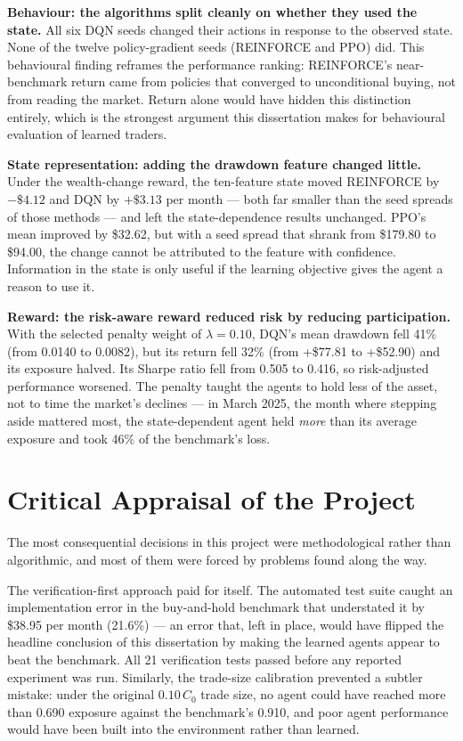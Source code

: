 \textbf{Behaviour: the algorithms split cleanly on whether they used the
state.} All six DQN seeds changed their actions in response to the observed
state. None of the twelve policy-gradient seeds (REINFORCE and PPO) did.
This behavioural finding reframes the performance ranking: REINFORCE's
near-benchmark return came from policies that converged to unconditional
buying, not from reading the market. Return alone would have hidden this
distinction entirely, which is the strongest argument this dissertation
makes for behavioural evaluation of learned traders.

\textbf{State representation: adding the drawdown feature changed little.}
Under the wealth-change reward, the ten-feature state moved REINFORCE by
$-\$4.12$ and DQN by $+\$3.13$ per month --- both far smaller than the seed
spreads of those methods --- and left the state-dependence results
unchanged. PPO's mean improved by \$32.62, but with a seed spread that
shrank from \$179.80 to \$94.00, the change cannot be attributed to the
feature with confidence. Information in the state is only useful if the
learning objective gives the agent a reason to use it.

\textbf{Reward: the risk-aware reward reduced risk by reducing
participation.} With the selected penalty weight of $\lambda = 0.10$, DQN's
mean drawdown fell 41\% (from 0.0140 to 0.0082), but its return fell 32\%
(from +\$77.81 to +\$52.90) and its exposure halved. Its Sharpe ratio fell
from 0.505 to 0.416, so risk-adjusted performance worsened. The penalty
taught the agents to hold less of the asset, not to time the market's
declines --- in March 2025, the month where stepping aside mattered most,
the state-dependent agent held \emph{more} than its average exposure and
took 46\% of the benchmark's loss.

\section{Critical Appraisal of the Project}

The most consequential decisions in this project were methodological rather
than algorithmic, and most of them were forced by problems found along the
way.

The verification-first approach paid for itself. The automated test suite
caught an implementation error in the buy-and-hold benchmark that
understated it by \$38.95 per month (21.6\%) --- an error that, left in
place, would have flipped the headline conclusion of this dissertation by
making the learned agents appear to beat the benchmark. All 21 verification
tests passed before any reported experiment was run. Similarly, the
trade-size calibration prevented a subtler mistake: under the original
$0.10\,C_0$ trade size, no agent could have reached more than 0.690
exposure against the benchmark's 0.910, and poor agent performance would
have been built into the environment rather than learned.

